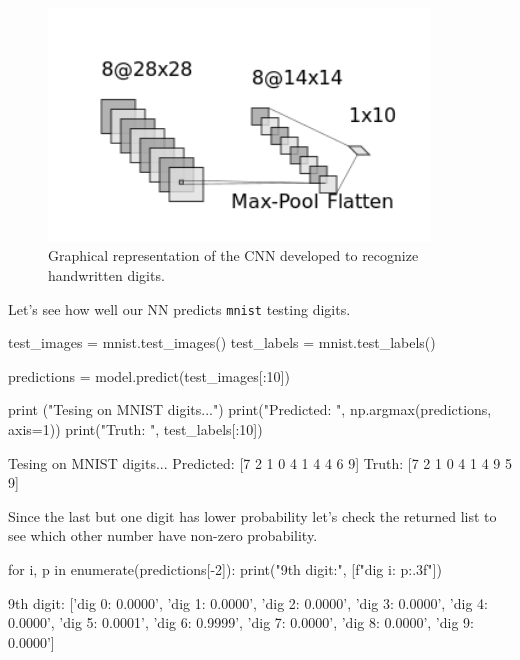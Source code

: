 \begin{figure}[hb]
\centering
\includegraphics[width=0.9\textwidth]{figures/cnn_2d}
\caption{Graphical representation of the CNN developed to recognize handwritten digits.}
\label{fig:cnn2d}
\end{figure}

Let's see how well our NN predicts \texttt{mnist} testing digits.

\begin{ipython}
test_images = mnist.test_images()
test_labels = mnist.test_labels()

predictions = model.predict(test_images[:10])

print ("Tesing on MNIST digits...")
print("Predicted: ", np.argmax(predictions, axis=1)) 
print("Truth:     ", test_labels[:10])
\end{ipython}
\begin{ioutput}
Tesing on MNIST digits...
Predicted:  [7 2 1 0 4 1 4 4 6 9]
Truth: [7 2 1 0 4 1 4 9 5 9]
\end{ioutput}

Since the last but one digit has lower probability let's check the returned list to see which other number have non-zero probability.

\begin{ipython}
for i, p in enumerate(predictions[-2]):
    print("9th digit:", [f"dig {i}: {p:.3f}"])
\end{ipython}
\begin{ioutput}
9th digit: ['dig 0: 0.0000', 'dig 1: 0.0000', 'dig 2: 0.0000', 'dig 3: 0.0000', 
            'dig 4: 0.0000', 'dig 5: 0.0001', 'dig 6: 0.9999', 'dig 7: 0.0000', 
            'dig 8: 0.0000', 'dig 9: 0.0000']
\end{ioutput}


